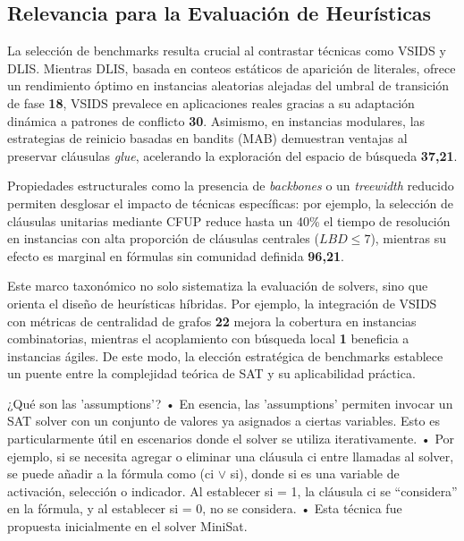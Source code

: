 \subsection{Relevancia para la Evaluación de Heurísticas}
La selección de benchmarks resulta crucial al contrastar técnicas como VSIDS y DLIS. Mientras DLIS, basada en conteos estáticos de aparición de literales, ofrece un rendimiento óptimo en instancias aleatorias alejadas del umbral de transición de fase \textbf{18}, VSIDS prevalece en aplicaciones reales gracias a su adaptación dinámica a patrones de conflicto \textbf{30}. Asimismo, en instancias modulares, las estrategias de reinicio basadas en bandits (MAB) demuestran ventajas al preservar cláusulas \textit{glue}, acelerando la exploración del espacio de búsqueda \textbf{37,21}.

Propiedades estructurales como la presencia de \textit{backbones} o un \textit{treewidth} reducido permiten desglosar el impacto de técnicas específicas: por ejemplo, la selección de cláusulas unitarias mediante CFUP reduce hasta un 40\% el tiempo de resolución en instancias con alta proporción de cláusulas centrales ($LBD\le7$), mientras su efecto es marginal en fórmulas sin comunidad definida \textbf{96,21}.

Este marco taxonómico no solo sistematiza la evaluación de solvers, sino que orienta el diseño de heurísticas híbridas. Por ejemplo, la integración de VSIDS con métricas de centralidad de grafos \textbf{22} mejora la cobertura en instancias combinatorias, mientras el acoplamiento con búsqueda local \textbf{1} beneficia a instancias ágiles. De este modo, la elección estratégica de benchmarks establece un puente entre la complejidad teórica de SAT y su aplicabilidad práctica.




¿Qué son las 'assumptions'?
•
En esencia, las 'assumptions' permiten invocar un SAT solver con un conjunto de valores ya asignados a ciertas variables. Esto es particularmente útil en escenarios donde el solver se utiliza iterativamente.
•
Por ejemplo, si se necesita agregar o eliminar una cláusula ci entre llamadas al solver, se puede añadir a la fórmula como (ci $\lor$ si), donde si es una variable de activación, selección o indicador. Al establecer si = 1, la cláusula ci se ``considera'' en la fórmula, y al establecer si = 0, no se considera.
•
Esta técnica fue propuesta inicialmente en el solver MiniSat. %

